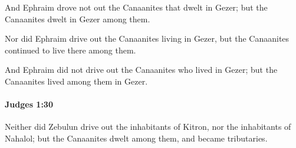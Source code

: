 			\begin{versebox}
					\item[BHS] 
					\item[ASV] And Ephraim drove not out the Canaanites that dwelt in Gezer; but the Canaanites dwelt in Gezer among them.
					\item[NIV] Nor did Ephraim drive out the Canaanites living in Gezer, but the Canaanites continued to live there among them.
					\item[NRSV] And Ephraim did not drive out the Canaanites who lived in Gezer; but the Canaanites lived among them in Gezer.
			\end{versebox}

		\paragraph{Judges 1:30} %
			\label{JUDGES-1-30}

			Neither did Zebulun drive out the inhabitants of Kitron, nor the inhabitants of Nahalol; but the Canaanites dwelt among them, and became tributaries.

